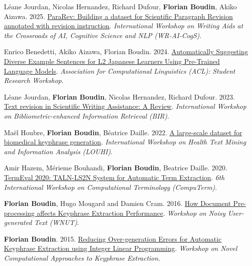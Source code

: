 \item
Léane Jourdan, Nicolas Hernandez, Richard Dufour, \textbf{Florian Boudin}, Akiko Aizawa.
2025.
\href{https://aclanthology.org/2025.wraicogs-1.4.pdf}{ParaRev: Building a dataset for Scientific Paragraph Revision annotated with revision instruction}.
\textit{International Workshop on Writing Aids at the Crossroads of AI, Cognitive Science and NLP (WR-AI-CogS)}.
\label{jourdan-etal-2025-pararev}

\item 
Enrico Benedetti, Akiko Aizawa, Florian Boudin.
2024.
\href{https://aclanthology.org/2024.acl-srw.11.pdf}{Automatically Suggesting Diverse Example Sentences for L2 Japanese Learners Using Pre-Trained Language Models}.
\textit{Association for Computational Linguistics (ACL): Student Research Workshop}.
\label{benedetti-etal-2024-automatically}

\item 
Léane Jourdan, \textbf{Florian Boudin}, Nicolas Hernandez, Richard Dufour.
2023.
\href{https://ceur-ws.org/Vol-3617/paper-04.pdf}{Text revision in Scientific Writing Assistance: A Review}.
\textit{International Workshop on Bibliometric-enhanced Information Retrieval (BIR)}.
\label{jourdan-etal-2023-text}

\item 
Maël Houbre, \textbf{Florian Boudin}, Béatrice Daille.
2022.
\href{https://aclanthology.org/2022.louhi-1.6.pdf}{A large-scale dataset for biomedical keyphrase generation}.
\textit{International Workshop on Health Text Mining and Information Analysis (LOUHI)}.
\label{houbre-etal-2022-large}

\item 
Amir Hazem, Mérieme Bouhandi, \textbf{Florian Boudin}, Beatrice Daille.
2020.
\href{https://aclanthology.org/2020.computerm-1.13.pdf}{TermEval 2020: TALN-LS2N System for Automatic Term Extraction}.
\textit{6th International Workshop on Computational Terminology (CompuTerm)}.
\label{hazem-etal-2020-termeval}

\item 
\textbf{Florian Boudin}, Hugo Mougard and Damien Cram.
2016.
\href{https://aclanthology.org/W16-3917.pdf}{How Document Pre-processing affects Keyphrase Extraction Performance}.
\textit{Workshop on Noisy User-generated Text (WNUT)}.
\label{boudin-etal-2016-document}

\item 
\textbf{Florian Boudin}.
2015.
\href{https://aclanthology.org/W15-3605.pdf}{Reducing Over-generation Errors for Automatic Keyphrase Extraction using Integer Linear Programming}.
\textit{Workshop on Novel Computational Approaches to Keyphrase Extraction}.
\label{boudin-2015-reducing}

